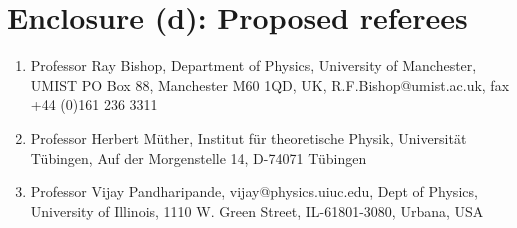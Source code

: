 

\section*{Enclosure (d): Proposed referees}

\begin{enumerate}
\item Professor Ray Bishop, Department of Physics, University of Manchester,
UMIST PO Box 88,   Manchester M60 1QD, UK, R.F.Bishop@umist.ac.uk, fax  
                                 +44 (0)161 236 3311 
\item Professor Herbert M\"uther, Institut f\"ur theoretische Physik,
Universit\"at T\"ubingen, Auf der Morgenstelle 14, D-74071 T\"ubingen
\item Professor Vijay Pandharipande, vijay@physics.uiuc.edu,
                    Dept of Physics, University of Illinois, 
                    1110 W. Green Street, IL-61801-3080, Urbana, USA


\end{enumerate}



